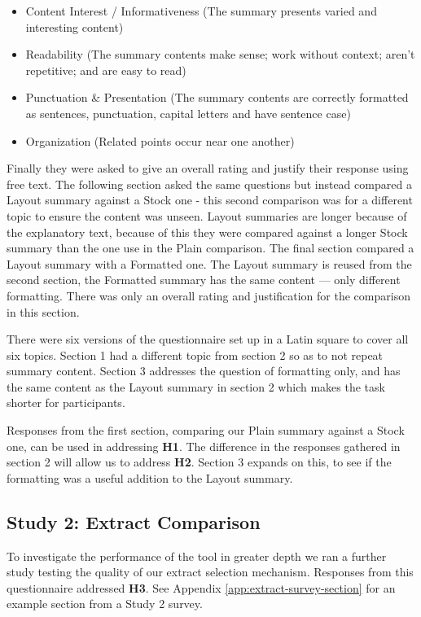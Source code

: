       \begin{itemize}
        \item{Content Interest / Informativeness (The summary presents varied and interesting content)}
        \item{Readability (The summary contents make sense; work without context; aren't repetitive; and are easy to read)}
        \item{Punctuation \& Presentation (The summary contents are correctly formatted as sentences, punctuation, capital letters and have sentence case)}
        \item{Organization (Related points occur near one another)}
      \end{itemize}

      Finally they were asked to give an overall rating and justify their response using free text. The following section asked the same questions but instead compared a Layout summary against a Stock one - this second comparison was for a different topic to ensure the content was unseen. Layout summaries are longer because of the explanatory text, because of this they were compared against a longer Stock summary than the one use in the Plain comparison. The final section compared a Layout summary with a Formatted one. The Layout summary is reused from the second section, the Formatted summary has the same content --- only different formatting. There was only an overall rating and justification for the comparison in this section.

      There were six versions of the questionnaire set up in a Latin square to cover all six topics. Section 1 had a different topic from section 2 so as to not repeat summary content. Section 3 addresses the question of formatting only, and has the same content as the Layout summary in section 2 which makes the task shorter for participants.

      Responses from the first section, comparing our Plain summary against a Stock one, can be used in addressing \textbf{H1}. The difference in the responses gathered in section 2 will allow us to address \textbf{H2}. Section 3 expands on this, to see if the formatting was a useful addition to the Layout summary.

    \tocless\subsection{Study 2: Extract Comparison}
    To investigate the performance of the tool in greater depth we ran a further study testing the quality of our extract selection mechanism. Responses from this questionnaire addressed \textbf{H3}. See Appendix \ref{app:extract-survey-section} for an example section from a Study 2 survey.

